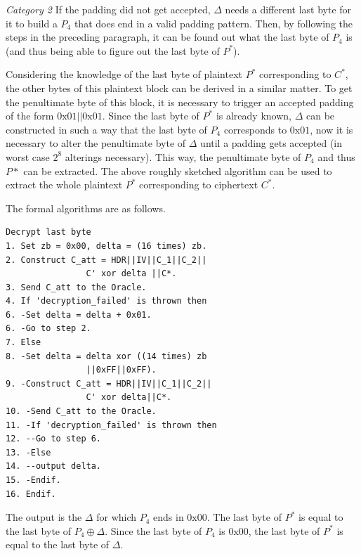 \documentclass[10pt,conference,a4paper]{IEEEtran}
\begin{document}
\textit{Category 2} If the padding did not get accepted, $\Delta$ needs a different last byte for it to build a $P_4$ that does end in a valid padding pattern. Then, by following the steps in the preceding paragraph, it can be found out what the last byte of $P_4$ is (and thus being able to figure out the last byte of $P^{*}$).

Considering the knowledge of the last byte of plaintext $P^{*}$ corresponding to $C^{*}$, the other bytes of this plaintext block can be derived in a similar matter. To get the penultimate byte of this block, it is necessary to trigger an accepted padding of the form $0\text{x}01||0\text{x}01$. Since the last byte of $P^{*}$ is already known, $\Delta$ can be constructed in such a way that the last byte of $P_4$ corresponds to $0\text{x}01$, now it is necessary to alter the penultimate byte of $\Delta$ until a padding gets accepted (in worst case $2^8$ alterings necessary). This way, the penultimate byte of $P_4$ and thus $P{*}$ can be extracted. The above roughly sketched algorithm can be used to extract the whole plaintext $P^{*}$ corresponding to ciphertext $C^{*}$.

The formal algorithms are as follows.
\begin{verbatim}
Decrypt last byte
1. Set zb = 0x00, delta = (16 times) zb.
2. Construct C_att = HDR||IV||C_1||C_2||
                C' xor delta ||C*.
3. Send C_att to the Oracle.
4. If 'decryption_failed' is thrown then
6. -Set delta = delta + 0x01.
6. -Go to step 2.
7. Else
8. -Set delta = delta xor ((14 times) zb
                ||0xFF||0xFF).
9. -Construct C_att = HDR||IV||C_1||C_2||
                C' xor delta||C*.
10. -Send C_att to the Oracle.
11. -If 'decryption_failed' is thrown then
12. --Go to step 6.
13. -Else
14. --output delta.
15. -Endif.
16. Endif.
\end{verbatim}
The output is the $\Delta$ for which $P_4$ ends in $0\text{x}00$. The last byte of $P^{*}$ is equal to the last byte of $P_4 \oplus \Delta$. Since the last byte of $P_4$ is $0\text{x}00$, the last byte of $P^{*}$ is equal to the last byte of $\Delta$.
\end{document}
